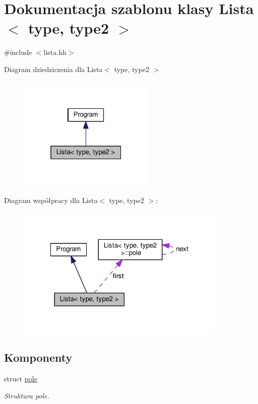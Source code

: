 \hypertarget{class_lista}{\section{Dokumentacja szablonu klasy Lista$<$ type, type2 $>$}
\label{class_lista}
}


{\ttfamily \#include $<$lista.\-hh$>$}



Diagram dziedziczenia dla Lista$<$ type, type2 $>$\nopagebreak
\begin{figure}[H]
\begin{center}
\leavevmode
\includegraphics[width=184pt]{class_lista__inherit__graph}
\end{center}
\end{figure}


Diagram współpracy dla Lista$<$ type, type2 $>$\-:\nopagebreak
\begin{figure}[H]
\begin{center}
\leavevmode
\includegraphics[width=285pt]{class_lista__coll__graph}
\end{center}
\end{figure}
\subsection*{Komponenty}
\begin{DoxyCompactItemize}
\item 
struct \hyperlink{struct_lista_1_1pole}{pole}
\begin{DoxyCompactList}\small\item\em Struktura pole. \end{DoxyCompactList}\end{DoxyCompactItemize}
